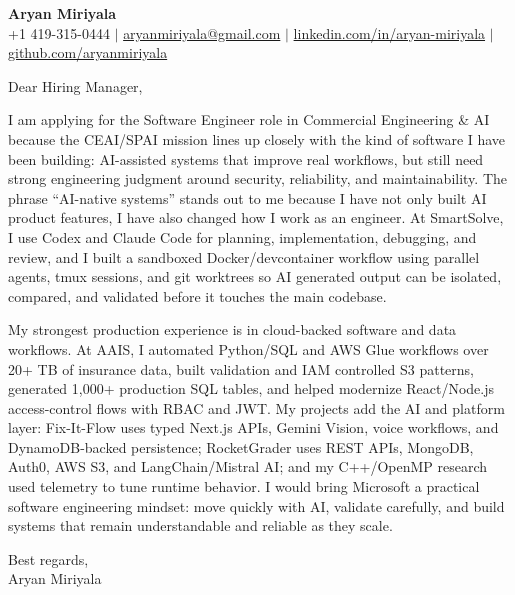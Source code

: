 \documentclass[letterpaper,11pt]{article}
\begin{document}
\begin{center}
{\Large \textbf{Aryan Miriyala}}\\
\vspace{2pt}
+1 419-315-0444 $|$ \href{mailto:aryanmiriyala@gmail.com}{aryanmiriyala@gmail.com} $|$
\href{https://www.linkedin.com/in/aryan-miriyala-7788a21b6/}{linkedin.com/in/aryan-miriyala} $|$
\href{https://github.com/aryanmiriyala}{github.com/aryanmiriyala}
\end{center}

\vspace{12pt}

Dear Hiring Manager,

I am applying for the Software Engineer role in Commercial Engineering \& AI because the CEAI/SPAI mission lines up closely with the kind of software I have been building: AI-assisted systems that improve real workflows, but still need strong engineering judgment around security, reliability, and maintainability. The phrase ``AI-native systems'' stands out to me because I have not only built AI product features, I have also changed how I work as an engineer. At SmartSolve, I use Codex and Claude Code for planning, implementation, debugging, and review, and I built a sandboxed Docker/devcontainer workflow using parallel agents, tmux sessions, and git worktrees so AI generated output can be isolated, compared, and validated before it touches the main codebase.

My strongest production experience is in cloud-backed software and data workflows. At AAIS, I automated Python/SQL and AWS Glue workflows over 20+ TB of insurance data, built validation and IAM controlled S3 patterns, generated 1,000+ production SQL tables, and helped modernize React/Node.js access-control flows with RBAC and JWT. My projects add the AI and platform layer: Fix-It-Flow uses typed Next.js APIs, Gemini Vision, voice workflows, and DynamoDB-backed persistence; RocketGrader uses REST APIs, MongoDB, Auth0, AWS S3, and LangChain/Mistral AI; and my C++/OpenMP research used telemetry to tune runtime behavior. I would bring Microsoft a practical software engineering mindset: move quickly with AI, validate carefully, and build systems that remain understandable and reliable as they scale.

Best regards,\\
Aryan Miriyala
\end{document}

